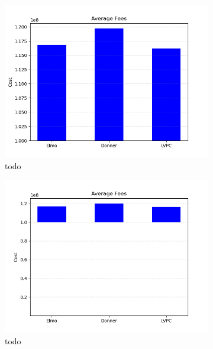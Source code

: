   \begin{figure}
  \begin{subfigure}{.3293\textwidth}
  \includegraphics[width=\textwidth]{../simulation/Fees_power_law.png}
  \caption{todo}
  \label{graph:power-law:fees}
  \end{subfigure}
  \begin{subfigure}{.3293\textwidth}
  \includegraphics[width=\textwidth]{../simulation/Fees_preferred_receiver.png}
  \caption{todo}
  \label{graph:power-law:fees}
  \end{subfigure}
  \begin{subfigure}{.3293\textwidth}

\end{subfigure}
\end{figure}
